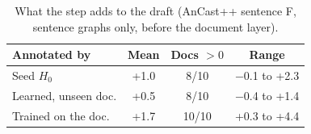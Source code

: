 \begin{table}[t]
\centering\small
\setlength{\tabcolsep}{4pt}
\begin{tabular}{@{}lccc@{}}
\toprule
Annotated by & Mean & Docs $>0$ & Range \\
\midrule
Seed $H_0$ & +1.0 & 8/10 & $-$0.1 to +2.3 \\
Learned, unseen doc. & +0.5 & 8/10 & $-$0.4 to +1.4 \\
Trained on the doc. & +1.7 & 10/10 & +0.3 to +4.4 \\
\bottomrule
\end{tabular}
\caption{What the  step adds to the  draft (AnCast++ sentence F, sentence graphs only, before the document layer).}
\label{tab:critique}
\end{table}
